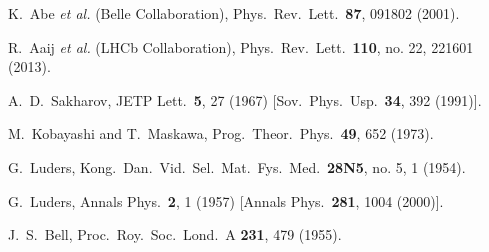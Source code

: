 \documentclass[aps,prd,twocolumn,groupedaddress,showpacs,superscriptaddress,floatfix,nofootinbib,10pt]{revtex4-1}
\begin{document}
\begin{thebibliography}{}
  K.~Abe {\it et al.} (Belle Collaboration),
  Phys.\ Rev.\ Lett.\  {\bf 87}, 091802 (2001).


  R.~Aaij {\it et al.} (LHCb Collaboration),
  Phys.\ Rev.\ Lett.\  {\bf 110}, no. 22, 221601 (2013).


  A.~D.~Sakharov,
  JETP Lett.\  {\bf 5}, 27 (1967)
  [Sov.\ Phys.\ Usp.\  {\bf 34}, 392 (1991)].
  
  
  M.~Kobayashi and T.~Maskawa,
  Prog.\ Theor.\ Phys.\  {\bf 49}, 652 (1973).


  G.~Luders,
  Kong.\ Dan.\ Vid.\ Sel.\ Mat.\ Fys.\ Med.\  {\bf 28N5}, no. 5, 1 (1954).


  G.~Luders,
  Annals Phys.\  {\bf 2}, 1 (1957)
  [Annals Phys.\  {\bf 281}, 1004 (2000)].


  J.~S.~Bell,
  Proc.\ Roy.\ Soc.\ Lond.\ A {\bf 231}, 479 (1955).



\end{thebibliography}
\end{document}
